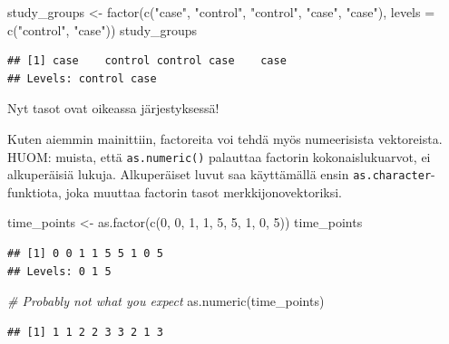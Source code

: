 \documentclass[
]{book}
\newenvironment{Shaded}{\begin{snugshade}}{\end{snugshade}}
\newcommand{\AttributeTok}[1]{\textcolor[rgb]{0.77,0.63,0.00}{#1}}
\newcommand{\CommentTok}[1]{\textcolor[rgb]{0.56,0.35,0.01}{\textit{#1}}}
\newcommand{\DecValTok}[1]{\textcolor[rgb]{0.00,0.00,0.81}{#1}}
\newcommand{\FunctionTok}[1]{\textcolor[rgb]{0.00,0.00,0.00}{#1}}
\newcommand{\NormalTok}[1]{#1}
\newcommand{\OtherTok}[1]{\textcolor[rgb]{0.56,0.35,0.01}{#1}}
\newcommand{\StringTok}[1]{\textcolor[rgb]{0.31,0.60,0.02}{#1}}
\begin{document}
\begin{Shaded}
\begin{Highlighting}[]
\NormalTok{study\_groups }\OtherTok{\textless{}{-}} \FunctionTok{factor}\NormalTok{(}\FunctionTok{c}\NormalTok{(}\StringTok{"case"}\NormalTok{, }\StringTok{"control"}\NormalTok{, }\StringTok{"control"}\NormalTok{, }\StringTok{"case"}\NormalTok{, }\StringTok{"case"}\NormalTok{),}
                       \AttributeTok{levels =} \FunctionTok{c}\NormalTok{(}\StringTok{"control"}\NormalTok{, }\StringTok{"case"}\NormalTok{))}
\NormalTok{study\_groups}
\end{Highlighting}
\end{Shaded}

\begin{verbatim}
## [1] case    control control case    case   
## Levels: control case
\end{verbatim}

Nyt tasot ovat oikeassa järjestyksessä!

Kuten aiemmin mainittiin, factoreita voi tehdä myös numeerisista vektoreista. HUOM: muista, että \texttt{as.numeric()} palauttaa factorin kokonaislukuarvot, ei alkuperäisiä lukuja. Alkuperäiset luvut saa käyttämällä ensin \texttt{as.character}-funktiota, joka muuttaa factorin tasot merkkijonovektoriksi.

\begin{Shaded}
\begin{Highlighting}[]
\NormalTok{time\_points }\OtherTok{\textless{}{-}} \FunctionTok{as.factor}\NormalTok{(}\FunctionTok{c}\NormalTok{(}\DecValTok{0}\NormalTok{, }\DecValTok{0}\NormalTok{, }\DecValTok{1}\NormalTok{, }\DecValTok{1}\NormalTok{, }\DecValTok{5}\NormalTok{, }\DecValTok{5}\NormalTok{, }\DecValTok{1}\NormalTok{, }\DecValTok{0}\NormalTok{, }\DecValTok{5}\NormalTok{))}
\NormalTok{time\_points}
\end{Highlighting}
\end{Shaded}

\begin{verbatim}
## [1] 0 0 1 1 5 5 1 0 5
## Levels: 0 1 5
\end{verbatim}

\begin{Shaded}
\begin{Highlighting}[]
\CommentTok{\# Probably not what you expect}
\FunctionTok{as.numeric}\NormalTok{(time\_points)}
\end{Highlighting}
\end{Shaded}

\begin{verbatim}
## [1] 1 1 2 2 3 3 2 1 3
\end{verbatim}
\end{document}
